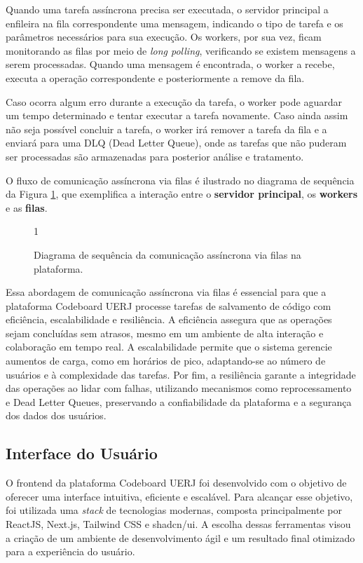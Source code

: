 Quando uma tarefa assíncrona precisa ser executada, o servidor principal a enfileira na fila correspondente uma mensagem, indicando o tipo de tarefa e os parâmetros necessários para sua execução. Os workers, por sua vez, ficam monitorando as filas por meio de \emph{long polling}, verificando se existem mensagens a serem processadas. Quando uma mensagem é encontrada, o worker a recebe, executa a operação correspondente e posteriormente a remove da fila.

Caso ocorra algum erro durante a execução da tarefa, o worker pode aguardar um tempo determinado e tentar executar a tarefa novamente. Caso ainda assim não seja possível concluir a tarefa, o worker irá remover a tarefa da fila e a enviará para uma DLQ (Dead Letter Queue), onde as tarefas que não puderam ser processadas são armazenadas para posterior análise e tratamento.

O fluxo de comunicação assíncrona via filas é ilustrado no diagrama de sequência da Figura \ref{fig:queue-flow}, que exemplifica a interação entre o \textbf{servidor principal}, os \textbf{workers} e as \textbf{filas}.

\begin{figure}[H]{1\textwidth}
    \centering
    \caption{Diagrama de sequência da comunicação assíncrona via filas na plataforma.}
    \label{fig:queue-flow}
\end{figure}

Essa abordagem de comunicação assíncrona via filas é essencial para que a plataforma Codeboard UERJ processe tarefas de salvamento de código com eficiência, escalabilidade e resiliência. A eficiência assegura que as operações sejam concluídas sem atrasos, mesmo em um ambiente de alta interação e colaboração em tempo real. A escalabilidade permite que o sistema gerencie aumentos de carga, como em horários de pico, adaptando-se ao número de usuários e à complexidade das tarefas. Por fim, a resiliência garante a integridade das operações ao lidar com falhas, utilizando mecanismos como reprocessamento e Dead Letter Queues, preservando a confiabilidade da plataforma e a segurança dos dados dos usuários.


\subsection{Interface do Usuário}

O frontend da plataforma Codeboard UERJ foi desenvolvido com o objetivo de oferecer uma interface intuitiva, eficiente e escalável. Para alcançar esse objetivo, foi utilizada uma \emph{stack} de tecnologias modernas, composta principalmente por ReactJS, Next.js, Tailwind CSS e shadcn/ui. A escolha dessas ferramentas visou a criação de um ambiente de desenvolvimento ágil e um resultado final otimizado para a experiência do usuário.

